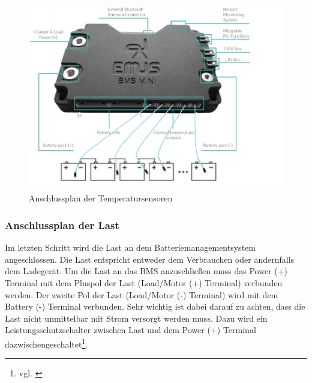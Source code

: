 \begin{figure}[H]
	\begin{center}
		\includegraphics[scale=0.7]{figures/Akku/SystemStrukturBMSTemperatur.png}
		\caption{Anschlussplan der Temperatursensoren\cite{AnschlussplanTemp}}
		\label{fig: Anschlussplan der Temperatursensoren}
	\end{center}
\end{figure}
\newpage

\subsubsection{Anschlussplan der Last}

Im letzten Schritt wird die Last an dem Batteriemanagementsystem angeschlossen. Die Last entspricht entweder dem Verbrauchen oder andernfalls dem Ladegerät. Um die Last an das BMS anzuschließen muss das Power (+) Terminal mit dem Pluspol der Last (Load/Motor (+) Terminal) verbunden werden. Der zweite Pol der Last (Load/Motor (-) Terminal) wird mit dem Battery (-) Terminal verbunden. Sehr wichtig ist dabei darauf zu achten, dass die Last nicht unmittelbar mit Strom versorgt werden muss. Dazu wird ein Leistungsschutzschalter zwischen Last und dem Power (+) Terminal dazwischengeschaltet\footnote{vgl. \cite{Lastmess}}.


